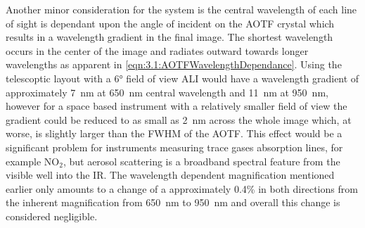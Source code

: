 \documentclass[12pt]{article}
\begin{document}
Another minor consideration for the system is the central wavelength of each line of sight is dependant upon the angle of incident on the AOTF crystal which results in a 
wavelength gradient in the final image. The shortest wavelength occurs in the center of the image and radiates outward towards longer wavelengths as apparent in 
\autoref{eqn:3.1:AOTFWavelengthDependance}. Using the telescoptic layout with a 6\si{\degree} field of view ALI would have a wavelength gradient of approximately 7~nm at 650~nm 
central wavelength and 11~nm at 950~nm, however for a space based instrument with a relatively smaller field of view the gradient could be reduced to as small as 2~nm across the 
whole image which, at worse, is slightly larger than the FWHM of the AOTF. This effect would be a significant problem for instruments measuring trace gases absorption lines, for 
example NO$_{2}$, but aerosol scattering is a broadband spectral feature from the visible well into the IR. The wavelength dependent magnification mentioned earlier only amounts 
to a change of a approximately 0.4\% in both directions from the inherent magnification from 650~nm to 950~nm and overall this change is considered negligible.
\end{document}
